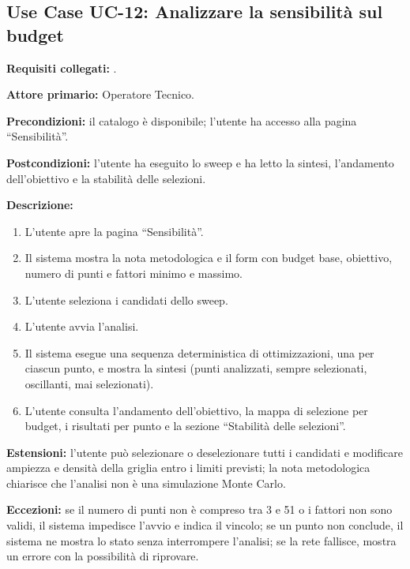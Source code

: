 \subsection*{Use Case UC-12: Analizzare la sensibilità sul budget}
\textbf{Requisiti collegati:} .\par
\textbf{Attore primario:} Operatore Tecnico.\par
\textbf{Precondizioni:} il catalogo è disponibile; l'utente ha accesso alla pagina ``Sensibilità''.\par
\textbf{Postcondizioni:} l'utente ha eseguito lo sweep e ha letto la sintesi, l'andamento dell'obiettivo e la stabilità delle selezioni.\par
\textbf{Descrizione:}
\begin{enumerate}[leftmargin=1.6em, itemsep=0.1em]
    \item L'utente apre la pagina ``Sensibilità''.
    \item Il sistema mostra la nota metodologica e il form con budget base, obiettivo, numero di punti e fattori minimo e massimo.
    \item L'utente seleziona i candidati dello sweep.
    \item L'utente avvia l'analisi.
    \item Il sistema esegue una sequenza deterministica di ottimizzazioni, una per ciascun punto, e mostra la sintesi (punti analizzati, sempre selezionati, oscillanti, mai selezionati).
    \item L'utente consulta l'andamento dell'obiettivo, la mappa di selezione per budget, i risultati per punto e la sezione ``Stabilità delle selezioni''.
\end{enumerate}
\textbf{Estensioni:} l'utente può selezionare o deselezionare tutti i candidati e modificare ampiezza e densità della griglia entro i limiti previsti; la nota metodologica chiarisce che l'analisi non è una simulazione Monte Carlo.\par
\textbf{Eccezioni:} se il numero di punti non è compreso tra 3 e 51 o i fattori non sono validi, il sistema impedisce l'avvio e indica il vincolo; se un punto non conclude, il sistema ne mostra lo stato senza interrompere l'analisi; se la rete fallisce, mostra un errore con la possibilità di riprovare.

